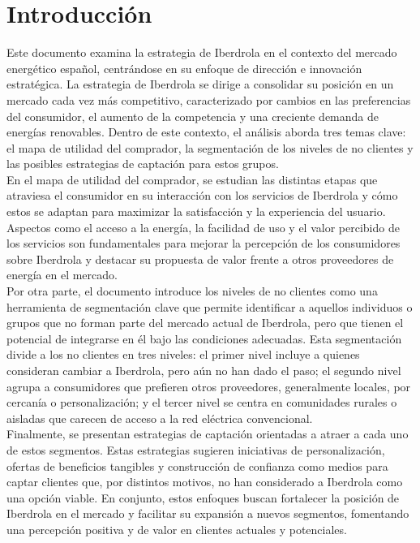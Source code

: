 \documentclass{article}
\begin{document}
\newpage

\tableofcontents
\newpage
\listoffigures
\newpage
\listoftables
\newpage

\section{Introducción}
Este documento examina la estrategia de Iberdrola en el contexto del mercado energético español, centrándose en su enfoque de dirección e innovación estratégica. La estrategia de Iberdrola se dirige a consolidar su posición en un mercado cada vez más competitivo, caracterizado por cambios en las preferencias del consumidor, el aumento de la competencia y una creciente demanda de energías renovables. Dentro de este contexto, el análisis aborda tres temas clave: el mapa de utilidad del comprador, la segmentación de los niveles de no clientes y las posibles estrategias de captación para estos grupos.
\\

En el mapa de utilidad del comprador, se estudian las distintas etapas que atraviesa el consumidor en su interacción con los servicios de Iberdrola y cómo estos se adaptan para maximizar la satisfacción y la experiencia del usuario. Aspectos como el acceso a la energía, la facilidad de uso y el valor percibido de los servicios son fundamentales para mejorar la percepción de los consumidores sobre Iberdrola y destacar su propuesta de valor frente a otros proveedores de energía en el mercado.
\\

Por otra parte, el documento introduce los niveles de no clientes como una herramienta de segmentación clave que permite identificar a aquellos individuos o grupos que no forman parte del mercado actual de Iberdrola, pero que tienen el potencial de integrarse en él bajo las condiciones adecuadas. Esta segmentación divide a los no clientes en tres niveles: el primer nivel incluye a quienes consideran cambiar a Iberdrola, pero aún no han dado el paso; el segundo nivel agrupa a consumidores que prefieren otros proveedores, generalmente locales, por cercanía o personalización; y el tercer nivel se centra en comunidades rurales o aisladas que carecen de acceso a la red eléctrica convencional.
\\

Finalmente, se presentan estrategias de captación orientadas a atraer a cada uno de estos segmentos. Estas estrategias sugieren iniciativas de personalización, ofertas de beneficios tangibles y construcción de confianza como medios para captar clientes que, por distintos motivos, no han considerado a Iberdrola como una opción viable. En conjunto, estos enfoques buscan fortalecer la posición de Iberdrola en el mercado y facilitar su expansión a nuevos segmentos, fomentando una percepción positiva y de valor en clientes actuales y potenciales.
\newpage
\end{document}
